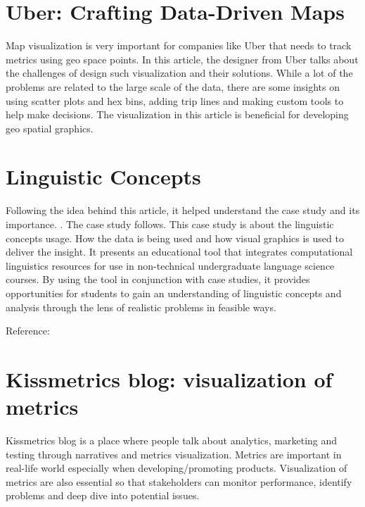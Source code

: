 \documentclass[]{book}
\theoremstyle{definition}
\theoremstyle{definition}
\theoremstyle{definition}
\theoremstyle{remark}
\begin{document}
\section{Uber: Crafting Data-Driven
Maps}\label{uber-crafting-data-driven-maps}

\citep{uber_maps} Map visualization is very important for companies like
Uber that needs to track metrics using geo space points. In this
article, the designer from Uber talks about the challenges of design
such visualization and their solutions. While a lot of the problems are
related to the large scale of the data, there are some insights on using
scatter plots and hex bins, adding trip lines and making custom tools to
help make decisions. The visualization in this article is beneficial for
developing geo spatial graphics.

\section{Linguistic Concepts}\label{linguistic-concepts}

\citep{lingui_data} Following the idea behind this article, it helped
understand the case study and its importance. \citep{article_case}. The
case study follows. This case study is about the linguistic concepts
usage. How the data is being used and how visual graphics is used to
deliver the insight. It presents an educational tool that integrates
computational linguistics resources for use in non-technical
undergraduate language science courses. By using the tool in conjunction
with case studies, it provides opportunities for students to gain an
understanding of linguistic concepts and analysis through the lens of
realistic problems in feasible ways.

Reference: \citep{lingui_data}

\section{Kissmetrics blog: visualization of
metrics}\label{kissmetrics-blog-visualization-of-metrics}

\citep{facebook_organic} Kissmetrics blog is a place where people talk
about analytics, marketing and testing through narratives and metrics
visualization. Metrics are important in real-life world especially when
developing/promoting products. Visualization of metrics are also
essential so that stakeholders can monitor performance, identify
problems and deep dive into potential issues.
\end{document}
